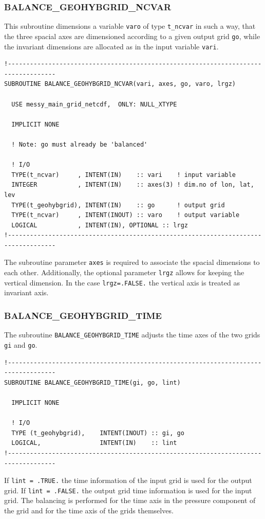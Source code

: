 \documentclass[11pt,twoside]{article}
\begin{document}
\subsubsection{\label{BGNC}BALANCE\_GEOHYBGRID\_NCVAR\label{BALGRIDVAR}}
This subroutine dimensions a variable \verb|varo| of type \verb|t_ncvar|
in such a way, that the three spacial axes are dimensioned according to a given
output grid \verb|go|, while the invariant dimensions are allocated as
in the input variable \verb|vari|.
\begin{verbatim}
!-----------------------------------------------------------------------------------
SUBROUTINE BALANCE_GEOHYBGRID_NCVAR(vari, axes, go, varo, lrgz)

  USE messy_main_grid_netcdf,  ONLY: NULL_XTYPE

  IMPLICIT NONE

  ! Note: go must already be 'balanced'

  ! I/O
  TYPE(t_ncvar)     , INTENT(IN)    :: vari    ! input variable
  INTEGER           , INTENT(IN)    :: axes(3) ! dim.no of lon, lat, lev
  TYPE(t_geohybgrid), INTENT(IN)    :: go      ! output grid
  TYPE(t_ncvar)     , INTENT(INOUT) :: varo    ! output variable
  LOGICAL           , INTENT(IN), OPTIONAL :: lrgz
!-----------------------------------------------------------------------------------
\end{verbatim}
The subroutine parameter \verb|axes| is required to associate the spacial
dimensions to each other. Additionally, the optional parameter \verb|lrgz|
allows for keeping the vertical dimension. In the case \verb|lrgz=.FALSE.|
the vertical axis is treated as invariant axis.
\subsubsection{BALANCE\_GEOHYBGRID\_TIME\label{BALGRIDTIME}}
The subroutine \verb|BALANCE_GEOHYBGRID_TIME| adjusts the time axes of
the two grids \verb|gi| and \verb|go|.

\begin{verbatim}
!-----------------------------------------------------------------------------------
SUBROUTINE BALANCE_GEOHYBGRID_TIME(gi, go, lint)

  IMPLICIT NONE

  ! I/O
  TYPE (t_geohybgrid),    INTENT(INOUT) :: gi, go
  LOGICAL,                INTENT(IN)    :: lint
!-----------------------------------------------------------------------------------
\end{verbatim}
If  \verb|lint = .TRUE.| the time information of the input
grid is used for the output grid. If  \verb|lint = .FALSE.| the output
grid time information is used for the input grid. The balancing is
performed for the time axis in the pressure component of the grid and
for the time axis of the grids themselves.
\end{document}
